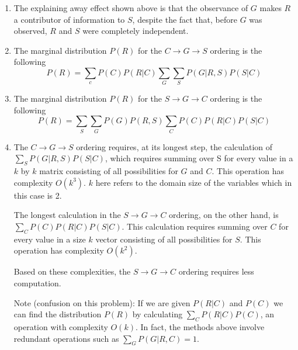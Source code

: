 \documentclass[submit]{harvardml}
\begin{document}
\begin{enumerate}
    \item
    The explaining away effect shown above is that the observance of $G$ makes $R$ a 
    contributor of information to $S$, despite the fact that, before $G$ was observed, $R$ and $S$ were
    completely independent.

    \item
    The marginal distribution $P(R)$ for the $C\rightarrow G\rightarrow S$ ordering is the following
    $$P(R) = \sum_c P(C)P(R|C) \sum_G\sum_S P(G|R,S)P(S|C)$$

    \item
    The marginal distribution $P(R)$ for the $S\rightarrow G\rightarrow C$ ordering is the following
    $$P(R) = \sum_S \sum_G P(G)P(R,S) \sum_C P(C)P(R|C)P(S|C)$$

    \item
    The $C\rightarrow G\rightarrow S$ ordering requires, at its longest step, the calculation of $\sum_S P(G|R,S)P(S|C)$, which requires summing over S for every value 
    in a $k$ by $k$ matrix consisting of all possibilities for $G$ and $C$. This operation has 
    complexity $O(k^3)$. $k$ here refers to the domain size of the variables which in this case is
    2.

    The longest calculation in the $S\rightarrow G\rightarrow C$ ordering, on the other hand, is
    $\sum_C P(C)P(R|C)P(S|C)$. This calculation requires summing over $C$ for every value in a 
    size $k$ vector consisting of all possibilities for $S$. This operation has complexity $O(k^2)$.

    Based on these complexities, the $S\rightarrow G\rightarrow C$ ordering requires less computation.

    Note (confusion on this problem): If we are given $P(R|C)$ and $P(C)$ we can find the distribution 
    $P(R)$ by calculating $\sum_C P(R|C)P(C)$, an operation with complexity $O(k)$. In fact, 
    the methods above involve redundant operations such as $\sum_G P(G|R, C)=1$.

\end{enumerate}
\newpage
\end{document}
